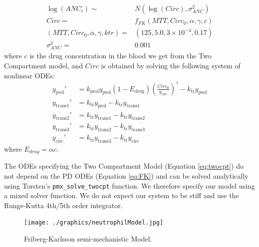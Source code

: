 \documentclass[10pt, reqno, oneside]{amsbook}
\numberwithin{equation}{chapter}
\numberwithin{figure}{chapter}
\numberwithin{table}{chapter}
\theoremstyle{remark}
\begin{document}
\begin{align}
  \log(ANC_i) \sim& N(\log(Circ), \sigma^2_{ANC})  \\
  Circ =& f_{FK}(MTT, Circ_{0}, \alpha, \gamma, c)  \\
  (MTT, Circ_{0}, \alpha, \gamma, ktr) =& (125, 5.0, 3 \times 10^{-4}, 0.17) \\
  \sigma^2_{ANC} =& 0.001
\end{align}
where \(c\) is the drug concentration in the blood we get from the Two
Compartment model, and \(Circ\) is obtained by solving the following
system of nonlinear ODEs:
\begin{subequations}
  \begin{align}
   y_\mathrm{prol}' &= k_\mathrm{prol} y_\mathrm{prol} (1 - E_\mathrm{drug})\left(\frac{Circ_0}{y_\mathrm{circ}}\right)^\gamma - k_\mathrm{tr}y_\mathrm{prol} \\
   y_\mathrm{trans1}' &= k_\mathrm{tr} y_\mathrm{prol} - k_\mathrm{tr} y_\mathrm{trans1} \\
   y_\mathrm{trans2}' &= k_\mathrm{tr} y_\mathrm{trans1} - k_\mathrm{tr} y_\mathrm{trans2}  \\
   y_\mathrm{trans3}' &= k_\mathrm{tr} y_\mathrm{trans2} - k_\mathrm{tr} y_\mathrm{trans3}  \\
   y_\mathrm{circ}' &= k_\mathrm{tr} y_\mathrm{trans3} - k_\mathrm{tr} y_\mathrm{circ}
   \end{align}
   \label{eq:FK}
\end{subequations}
where \(E_{drug}  = \alpha c\).

The ODEs specifying the Two Compartment Model
(Equation \eqref{eq:twocpt}) do not depend on the PD ODEs
(Equation \eqref{eq:FK}) and can be solved analytically
using Torsten's \texttt{pmx_solve_twocpt} function. We
therefore specify our model using a mixed solver function. We do not
expect our system to be stiff and use the Runge-Kutta 4th/5th order
integrator.

\begin{figure}[htbp]
\centering
\texttt{[image: ./graphics/neutrophilModel.jpg]}
\caption{\label{FK_model}
Friberg-Karlsson semi-mechanistic Model.}
\end{figure}
\end{document}
